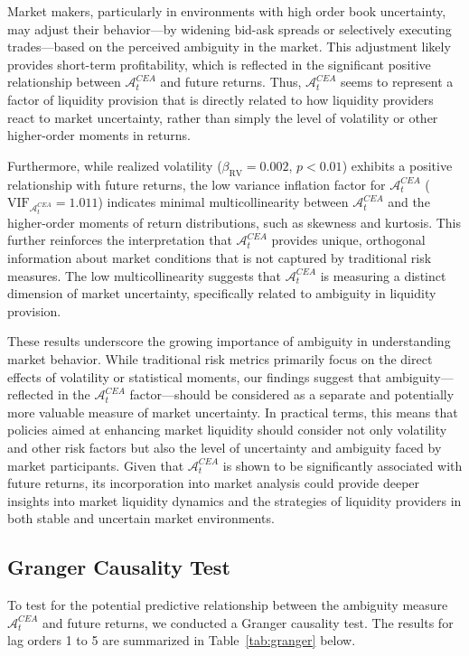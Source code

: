 \documentclass[preprint,12pt,authoryear]{elsarticle}
\begin{document}
Market makers, particularly in environments with high order book uncertainty, may adjust their behavior—by widening bid-ask spreads or selectively executing trades—based on the perceived ambiguity in the market. This adjustment likely provides short-term profitability, which is reflected in the significant positive relationship between $\mathcal{A}^{CEA}_t$ and future returns. Thus, $\mathcal{A}^{CEA}_t$ seems to represent a factor of liquidity provision that is directly related to how liquidity providers react to market uncertainty, rather than simply the level of volatility or other higher-order moments in returns.

Furthermore, while realized volatility (\(\beta_{\mathrm{RV}} = 0.002\), \(p < 0.01\)) exhibits a positive relationship with future returns, the low variance inflation factor for $\mathcal{A}^{CEA}_t$ (\(\mathrm{VIF}_{\mathcal{A}^{CEA}_t} = 1.011\)) indicates minimal multicollinearity between $\mathcal{A}^{CEA}_t$ and the higher-order moments of return distributions, such as skewness and kurtosis. This further reinforces the interpretation that $\mathcal{A}^{CEA}_t$ provides unique, orthogonal information about market conditions that is not captured by traditional risk measures. The low multicollinearity suggests that $\mathcal{A}^{CEA}_t$ is measuring a distinct dimension of market uncertainty, specifically related to ambiguity in liquidity provision.

These results underscore the growing importance of ambiguity in understanding market behavior. While traditional risk metrics primarily focus on the direct effects of volatility or statistical moments, our findings suggest that ambiguity—reflected in the $\mathcal{A}^{CEA}_t$ factor—should be considered as a separate and potentially more valuable measure of market uncertainty. In practical terms, this means that policies aimed at enhancing market liquidity should consider not only volatility and other risk factors but also the level of uncertainty and ambiguity faced by market participants. Given that $\mathcal{A}^{CEA}_t$ is shown to be significantly associated with future returns, its incorporation into market analysis could provide deeper insights into market liquidity dynamics and the strategies of liquidity providers in both stable and uncertain market environments.

\subsection{Granger Causality Test}
To test for the potential predictive relationship between the ambiguity measure $ \mathcal{A}^{CEA}_t $ and future returns, we conducted a Granger causality test. The results for lag orders 1 to 5 are summarized in Table~\ref{tab:granger} below.
\end{document}
